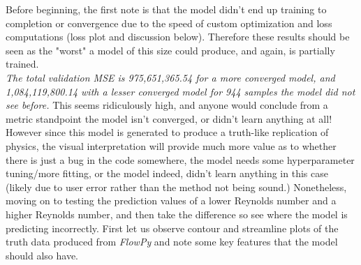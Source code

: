 \documentclass{article}
\begin{document}
\noindent Before beginning, the first note is that the model didn't end
up training to completion or convergence due to the speed of custom
optimization and loss computations (loss plot and discussion below). Therefore
these results should be seen as the "worst" a model of this size could produce,
and again, is partially trained. \\

\noindent \textit{The total validation MSE is 975,651,365.54 for a more
	converged model, and 1,084,119,800.14 with a lesser converged model for 944
	samples the model did not see before.} This seems ridiculously high, and anyone
would conclude from a metric standpoint the model isn't converged, or didn't
learn anything at all! However since this model is generated to produce a
truth-like replication of physics, the visual interpretation will provide much
more value as to whether there is just a bug in the code somewhere, the model
needs some hyperparameter tuning/more fitting, or the model indeed, didn't
learn anything in this case (likely due to user error rather than the method
not being sound.) Nonetheless, moving on to testing the prediction values of a
lower Reynolds number and a higher Reynolds number, and then take the
difference so see where the model is predicting incorrectly. First let us
observe contour and streamline plots of the truth data produced from
\textit{FlowPy} and note some key features that the model should also have.
\end{document}
